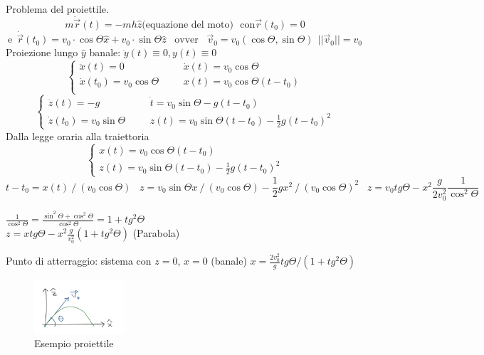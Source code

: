 \begin{example}
    Problema del proiettile.
    $$m\ddot{\vec{r}}(t) = -mh\hat{z} \text{(equazione del moto)}\:\:\: \text{con}\vec{r}(t_0) = 0$$
    $$\text{e}\:\: \dot{\vec{r}}(t_0) = v_0 \cdot \cos\Theta\hat{x} + v_0 \cdot \sin\Theta\hat{z} \hspace{10pt}\text{ovver}\hspace{10pt}\vec{v}_0 = v_0(\cos\Theta, \sin\Theta) \:\: ||\vec{v}_0|| = v_0$$
    Proiezione lungo $\hat{y}$ banale: $\ddot{y}(t) \equiv 0, y(t) \equiv 0$
    $$
    \begin{cases}
        \ddot{x}(t) = 0& \hspace{20pt} \dot{x}(t) = v_0 \cos\Theta \\
        \dot{x}(t_0) = v_0 \cos\Theta & \hspace{20pt} x(t) = v_0\cos\Theta (t-t_0)\\
    \end{cases}
    $$
    $$
    \begin{cases}
        \ddot{z}(t) = -g & \hspace{20pt} \dot{t} = v_0 \sin\Theta - g(t - t_0)\\
        \dot{z}(t_0) = v_0 \sin\Theta & \hspace{20pt} z(t) = v_0\sin\Theta(t - t_0) - \frac{1}{2}g (t - t_0)^2
    \end{cases}
    $$
    Dalla legge oraria alla traiettoria
    $$
    \begin{cases}
        x(t) = v_0 \cos\Theta(t - t_0)\\
        z(t) = v_0\sin\Theta(t - t_0) - \frac{1}{2}g(t - t_0)^2
    \end{cases}
    $$
    $$t - t_0 = x(t) \: / \: (v_0\cos\Theta) \hspace{10pt} z = v_0\sin\Theta x\: / \: (v_0 \cos\Theta) - \frac{1}{2}g x^2 \: / \: (v_0\cos\Theta)^2 \hspace{10pt} z=v_0 tg\Theta - x^2 \frac{g}{2v_0^2}\frac{1}{\cos^2\Theta}$$
    \begin{observation}
        $\frac{1}{\cos^2\Theta} = \frac{\sin^2\Theta + \cos^2\Theta}{\cos^2\Theta} = 1 + tg^2\Theta$\\
        $z = x tg\Theta - x^2 \frac{g}{v_0^2}(1 + tg^2 \Theta)$ (Parabola)
    \end{observation}
    \hspace{-15pt}Punto di atterraggio: sistema con $z = 0$, $x = 0$ (banale) \hspace{10pt} $x = \frac{2v^2_0}{g}tg\Theta / (1 + tg^2 \Theta)$
\end{example}
\begin{figure}[h!]
    \centering
    \includegraphics[width=0.3\textwidth]{images/esempio-proiettile.png}
    \caption*{Esempio proiettile}
\end{figure}

